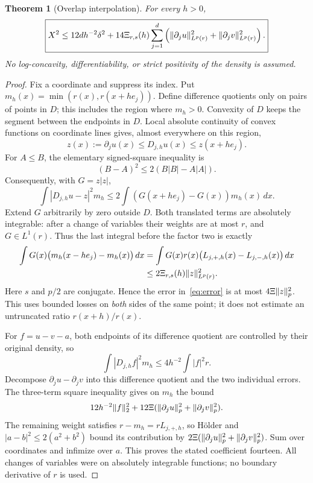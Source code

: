 \documentclass[11pt]{article}
\newtheorem{theorem}{Theorem}[section]
\theoremstyle{remark}\newtheorem{remark}[theorem]{Remark}
\begin{document}
\begin{theorem}[Overlap interpolation]\label{thm:interpolation}
For every $h>0$,
\begin{equation}\label{eq:overlap-interpolation}
 \boxed{X^2\le12d h^{-2}\delta^2+
 14\Xi_{r,s}(h)\sum_{j=1}^d
 \left(\lVert\partial_j u\rVert_{L^p(r)}^2+
       \lVert\partial_j v\rVert_{L^p(r)}^2\right).}
\end{equation}
No log-concavity, differentiability, or strict positivity of the density is assumed.
\end{theorem}
\begin{proof}
Fix a coordinate and suppress its index. Put $m_h(x)=\min(r(x),r(x+he_j))$. Define difference quotients only on pairs of points in $D$; this includes the region where $m_h>0$. Convexity of $D$ keeps the segment between the endpoints in $D$. Local absolute continuity of convex functions on coordinate lines gives, almost everywhere on this region,
\[
 z(x):=\partial_j u(x)\le D_{j,h}u(x)\le z(x+he_j).
\]
For $A\le B$, the elementary signed-square inequality is
\[
 (B-A)^2\le2(B|B|-A|A|).
\]
Consequently, with $G=z|z|$,
\begin{equation}\label{eq:error}
 \int|D_{j,h}u-z|^2m_h
 \le2\int(G(x+he_j)-G(x))m_h(x)\,dx.
\end{equation}
Extend $G$ arbitrarily by zero outside $D$. Both translated terms are absolutely integrable: after a change of variables their weights are at most $r$, and $G\in L^1(r)$. Thus the last integral before the factor two is exactly
\begin{align*}
 \int G(x)\bigl(m_h(x-he_j)-m_h(x)\bigr)\,dx
 &=\int G(x)r(x)
       \bigl(L_{j,+,h}(x)-L_{j,-,h}(x)\bigr)\,dx\\
 &\le2\Xi_{r,s}(h)\lVert z\rVert_{L^p(r)}^2.
\end{align*}
Here $s$ and $p/2$ are conjugate. Hence the error in~\eqref{eq:error} is at most $4\Xi\lVert z\rVert_p^2$. This uses bounded losses on \emph{both} sides of the same point; it does not estimate an untruncated ratio $r(x+h)/r(x)$.

For $f=u-v-a$, both endpoints of its difference quotient are controlled by their original density, so
\[
 \int|D_{j,h}f|^2m_h\le4h^{-2}\int|f|^2r.
\]
Decompose $\partial_j u-\partial_j v$ into this difference quotient and the two individual errors. The three-term square inequality gives on $m_h$ the bound
\[
 12h^{-2}\lVert f\rVert_2^2+12\Xi
       (\lVert\partial_j u\rVert_p^2+\lVert\partial_j v\rVert_p^2).
\]
The remaining weight satisfies $r-m_h=rL_{j,+,h}$, so H\"older and $|a-b|^2\le2(a^2+b^2)$ bound its contribution by
$2\Xi(\lVert\partial_j u\rVert_p^2+\lVert\partial_j v\rVert_p^2)$.
Sum over coordinates and infimize over $a$. This proves the stated coefficient fourteen. All changes of variables were on absolutely integrable functions; no boundary derivative of $r$ is used.
\end{proof}
\end{document}
